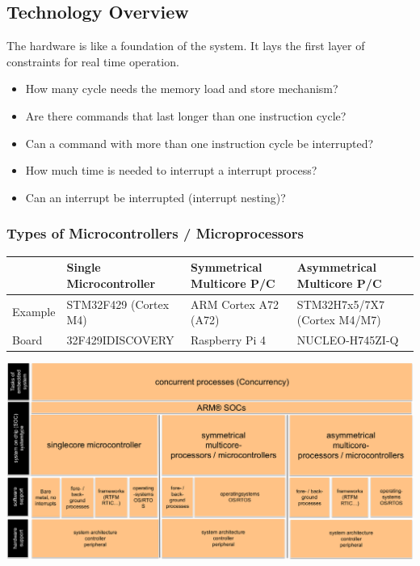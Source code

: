 \subsection{Technology Overview}
The hardware is like a foundation of the system.
It lays the first layer of constraints for real time operation.
\begin{itemize}
  \item How many cycle needs the memory load and store mechanism?
  \item Are there commands that last longer than one instruction cycle?
  \item Can a command with more than one instruction cycle be interrupted?
  \item How much time is needed to interrupt a interrupt process?
  \item Can an interrupt be interrupted (interrupt nesting)?
\end{itemize}

\subsubsection{Types of Microcontrollers / Microprocessors}
\begin{tabularx}{\textwidth}{l X X X}\hline
          & Single Microcontroller & Symmetrical Multicore \textmu{}P/\textmu{}C & Asymmetrical Multicore \textmu{}P/\textmu{}C \\\hline
  Example & STM32F429 (Cortex M4)  & ARM Cortex A72 (A72)                        & STM32H7x5/7X7 \linebreak(Cortex M4/M7)       \\
  Board   & 32F429IDISCOVERY       & Raspberry Pi 4                              & NUCLEO-H745ZI-Q                              \\\hline
\end{tabularx}

\includegraphics[width=\textwidth]{images/RTSystems/emb_landscape.png}

